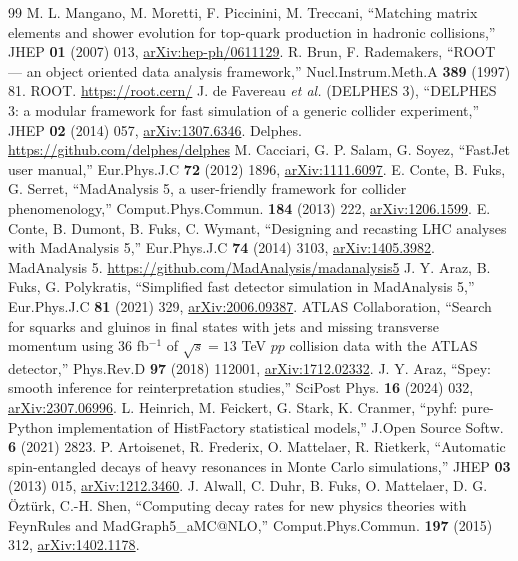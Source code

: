 \documentclass[a4paper,10pt]{ltjsarticle}
\begin{document}
\begin{thebibliography}{99}
 M. L. Mangano, M. Moretti, F. Piccinini, M. Treccani, ``Matching matrix elements and shower evolution for top-quark production in hadronic collisions,'' JHEP \textbf{01} (2007) 013, \href{https://arxiv.org/abs/hep-ph/0611129}{arXiv:hep-ph/0611129}.
 R. Brun, F. Rademakers, ``ROOT --- an object oriented data analysis framework,'' Nucl.Instrum.Meth.A \textbf{389} (1997) 81.
 ROOT. \url{https://root.cern/}
 J. de Favereau \textit{et al.} (DELPHES 3), ``DELPHES 3: a modular framework for fast simulation of a generic collider experiment,'' JHEP \textbf{02} (2014) 057, \href{https://arxiv.org/abs/1307.6346}{arXiv:1307.6346}.
 Delphes. \url{https://github.com/delphes/delphes}
 M. Cacciari, G. P. Salam, G. Soyez, ``FastJet user manual,'' Eur.Phys.J.C \textbf{72} (2012) 1896, \href{https://arxiv.org/abs/1111.6097}{arXiv:1111.6097}.
 E. Conte, B. Fuks, G. Serret, ``MadAnalysis 5, a user-friendly framework for collider phenomenology,'' Comput.Phys.Commun. \textbf{184} (2013) 222, \href{https://arxiv.org/abs/1206.1599}{arXiv:1206.1599}.
 E. Conte, B. Dumont, B. Fuks, C. Wymant, ``Designing and recasting LHC analyses with MadAnalysis 5,'' Eur.Phys.J.C \textbf{74} (2014) 3103, \href{https://arxiv.org/abs/1405.3982}{arXiv:1405.3982}.
 MadAnalysis 5. \url{https://github.com/MadAnalysis/madanalysis5}
 J. Y. Araz, B. Fuks, G. Polykratis, ``Simplified fast detector simulation in MadAnalysis 5,'' Eur.Phys.J.C \textbf{81} (2021) 329, \href{https://arxiv.org/abs/2006.09387}{arXiv:2006.09387}.
 ATLAS Collaboration, ``Search for squarks and gluinos in final states with jets and missing transverse momentum using 36 fb$^{-1}$ of $\sqrt s=13$ TeV $pp$ collision data with the ATLAS detector,'' Phys.Rev.D \textbf{97} (2018) 112001, \href{https://arxiv.org/abs/1712.02332}{arXiv:1712.02332}.
 J. Y. Araz, ``Spey: smooth inference for reinterpretation studies,'' SciPost Phys. \textbf{16} (2024) 032, \href{https://arxiv.org/abs/2307.06996}{arXiv:2307.06996}.
 L. Heinrich, M. Feickert, G. Stark, K. Cranmer, ``pyhf: pure-Python implementation of HistFactory statistical models,'' J.Open Source Softw. \textbf{6} (2021) 2823.
 P. Artoisenet, R. Frederix, O. Mattelaer, R. Rietkerk, ``Automatic spin-entangled decays of heavy resonances in Monte Carlo simulations,'' JHEP \textbf{03} (2013) 015, \href{https://arxiv.org/abs/1212.3460}{arXiv:1212.3460}.
 J. Alwall, C. Duhr, B. Fuks, O. Mattelaer, D. G. \"Ozt\"urk, C.-H. Shen, ``Computing decay rates for new physics theories with FeynRules and MadGraph5\_aMC@NLO,'' Comput.Phys.Commun. \textbf{197} (2015) 312, \href{https://arxiv.org/abs/1402.1178}{arXiv:1402.1178}.

\end{thebibliography}
\end{document}
